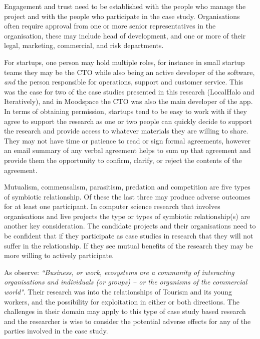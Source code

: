 Engagement and trust need to be established with the people who manage the project and with the people who participate in the case study. Organisations often require approval from one or more senior representatives in the organisation, these may include head of development, and one or more of their legal, marketing, commercial, and risk departments.

For startups, one person may hold multiple roles, for instance in small startup teams they may be the CTO while also being an active developer of the software, \emph{and} the person responsible for operations, support and customer service. This was the case for two of the case studies presented in this research (LocalHalo and Iteratively), and in Moodspace the CTO was also the main developer of the app. In terms of obtaining permission, startups tend to be easy to work with if they agree to support the research as one or two people can quickly decide to support the research and provide access to whatever materials they are willing to share. They may not have time or patience to read or sign formal agreements, however an email summary of any verbal agreement helps to sum up that agreement and provide them the opportunity to confirm, clarify, or reject the contents of the agreement.

Mutualism, commensalism, parasitism, predation and competition are five types of symbiotic relationship. %
Of these the last three may produce adverse outcomes for at least one participant.
In computer science research that involves organisations and live projects the type or types of symbiotic relationship(s) are another key consideration. The candidate projects and their organisations need to be confident that if they participate as case studies in research that they will not suffer in the relationship. If they see mutual benefits of the research they may be more willing to actively participate. 

As \citet[p.2]{robinson2019_applying_endosymbiosis_theory_tourism_and_its_young_workers} observe: \emph{``Business, or work, ecosystems are a community of interacting organisations and individuals (or groups) – or the organisms of the commercial world"}. Their research was into the relationships of Tourism and its young workers, and the possibility for exploitation in either or both directions. The challenges in their domain may apply to this type of case study based research and the researcher is wise to consider the potential adverse effects for any of the parties involved in the case study.

